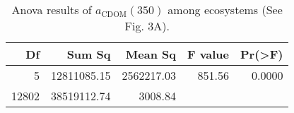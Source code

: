 \begin{table}[ht]
\centering
\begin{tabular}{rrrrr}
  \hline
Df & Sum Sq & Mean Sq & F value & Pr(>F) \\ 
  \hline
5 & 12811085.15 & 2562217.03 & 851.56 & 0.0000 \\ 
  12802 & 38519112.74 & 3008.84 &  &  \\ 
   \hline
\end{tabular}
\caption{Anova results of $a_{\text{CDOM}}(350)$ among ecosystems (See Fig. 3A).} 
\end{table}
